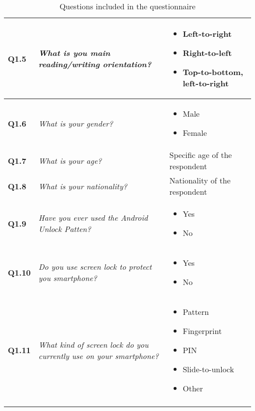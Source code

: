 \begin{longtable}{| p{1cm} | m{6.5cm} | m{3.5cm} |}
      {\bf Q1.5} & 
      {\it What is you main reading/writing orientation?} &
      \begin{itemize}
        \item Left-to-right
        \item Right-to-left
        \item Top-to-bottom, left-to-right
      \end{itemize} \\ \hline

      {\bf Q1.6} & 
      {\it What is your gender?} &
      \begin{itemize}
        \item Male
        \item Female
      \end{itemize} \\ \hline

      {\bf Q1.7} & 
      {\it What is your age?} &
      Specific age of the respondent \\ \hline

      {\bf Q1.8} & 
      {\it What is your nationality?} &
      Nationality of the respondent \\ \hline

      {\bf Q1.9} & 
      {\it Have you ever used the Android Unlock Patten?} &
      \begin{itemize}
        \item Yes
        \item No
      \end{itemize} \\ \hline

      {\bf Q1.10} & 
      {\it Do you use screen lock to protect you smartphone?} &
      \begin{itemize}
        \item Yes
        \item No
      \end{itemize} \\ \hline

      {\bf Q1.11} & 
      {\it What kind of screen lock do you currently use on your smartphone?} &
      \begin{itemize}
        \item Pattern
        \item Fingerprint
        \item PIN
        \item Slide-to-unlock
        \item Other
      \end{itemize} \\ \hline
    \caption{Questions included in the questionnaire}
    \label{tab:questions}
    \end{longtable}

